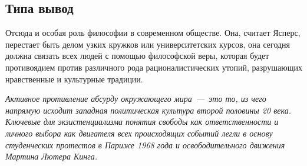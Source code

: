 \documentclass{bmstu}
\begin{document}
\subsection*{Типа вывод}

Отсюда и особая роль философии в современном обществе. Она, считает Ясперс, перестает быть делом узких кружков или университетских курсов, она сегодня должна связать всех людей с помощью философской веры, которая будет противоядием против различного рода рационалистических утопий, разрушающих нравственные и культурные традиции. 

\textit{Активное противление абсурду окружающего мира~---~это то, из чего напрямую исходит западная политическая культура второй половины 20 века. Ключевые для экзистенциализма понятия свободы как ответственности и личного выбора как двигателя всех происходящих событий легли в основу студенческих протестов в Париже 1968 года и освободительного движения Мартина Лютера Кинга.}
\end{document}
